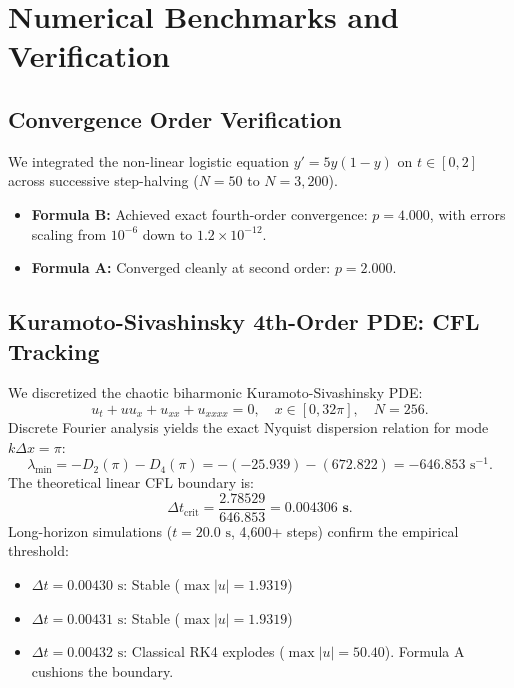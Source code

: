 \documentclass[11pt,a4paper]{article}
\theoremstyle{definition}
\begin{document}
\section{Numerical Benchmarks and Verification}

\subsection{Convergence Order Verification}
We integrated the non-linear logistic equation $y' = 5y(1 - y)$ on $t \in [0, 2]$ across successive step-halving ($N = 50$ to $N = 3,200$).
\begin{itemize}
    \item \textbf{Formula B:} Achieved exact fourth-order convergence: $p = 4.000$, with errors scaling from $10^{-6}$ down to $1.2 \times 10^{-12}$.
    \item \textbf{Formula A:} Converged cleanly at second order: $p = 2.000$.
\end{itemize}

\subsection{Kuramoto-Sivashinsky 4th-Order PDE: CFL Tracking}
We discretized the chaotic biharmonic Kuramoto-Sivashinsky PDE:
\begin{equation}
    u_t + u u_x + u_{xx} + u_{xxxx} = 0, \quad x \in [0, 32\pi], \quad N = 256.
\end{equation}
Discrete Fourier analysis yields the exact Nyquist dispersion relation for mode $k \Delta x = \pi$:
\begin{equation}
    \lambda_{\min} = -D_2(\pi) - D_4(\pi) = -(-25.939) - (672.822) = -646.853\text{ s}^{-1}.
\end{equation}
The theoretical linear CFL boundary is:
\begin{equation}
    \Delta t_{\text{crit}} = \frac{2.78529}{646.853} = \mathbf{0.004306\text{ s}}.
\end{equation}
Long-horizon simulations ($t = 20.0\text{ s}$, 4,600+ steps) confirm the empirical threshold:
\begin{itemize}
    \item $\Delta t = 0.00430\text{ s}$: Stable ($\max|u| = 1.9319$)
    \item $\Delta t = 0.00431\text{ s}$: Stable ($\max|u| = 1.9319$)
    \item $\Delta t = 0.00432\text{ s}$: Classical RK4 explodes ($\max|u| = 50.40$). Formula A cushions the boundary.
\end{itemize}
\end{document}
